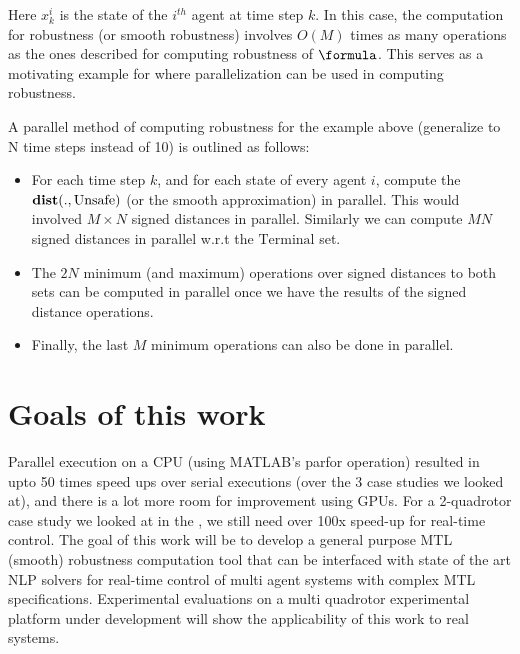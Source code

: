 Here $x^i_k$ is the state of the $i^{th}$ agent at time step $k$. In this case, the computation for robustness (or smooth robustness) involves $O(M)$ times as many operations as the ones described for computing robustness of $\formula$. This serves as a motivating example for where parallelization can be used in computing robustness. 

A parallel method of computing robustness for the example above (generalize to N time steps instead of 10) is outlined as follows:
\begin{itemize}
\item For each time step $k$, and for each state of every agent $i$, compute the $\mathbf{dist}(.,\text{Unsafe})$ (or the smooth approximation) in parallel. This would involved $M \times N$ signed distances in parallel. Similarly we can compute $MN$ signed distances in parallel w.r.t the $\text{Terminal}$ set. 

\item The $2N$ minimum (and maximum) operations over signed distances to both sets can be computed in parallel once we have the results of the signed distance operations.

\item Finally, the last $M$ minimum operations can also be done in parallel. 
\end{itemize}


\section{Goals of this work}
Parallel execution on a CPU (using MATLAB's parfor operation) resulted in upto 50 times speed ups over serial executions (over the 3 case studies we looked at), and there is a lot more room for improvement using GPUs. For a 2-quadrotor case study we looked at in the \cite{PantAM17_SmoothOpTechRpt}, we still need over 100x speed-up for real-time control. The goal of this work will be to develop a general purpose MTL (smooth) robustness computation tool that can be interfaced with state of the art NLP solvers for real-time control of multi agent systems with complex MTL specifications. Experimental evaluations on a multi quadrotor experimental platform under development will show the applicability of this work to real systems.



